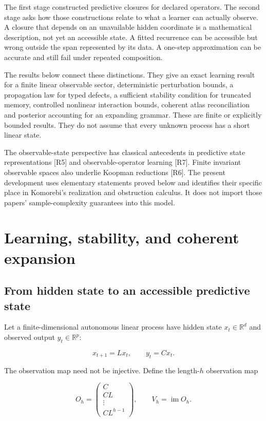 \label{LSM:part-ii.-learning-stability-and-coherent-expansion}

The first stage constructed predictive closures for declared operators.
The second stage asks how those constructions relate to what a learner
can actually observe. A closure that depends on an unavailable hidden
coordinate is a mathematical description, not yet an accessible state. A
fitted recurrence can be accessible but wrong outside the span
represented by its data. A one-step approximation can be accurate and
still fail under repeated composition.

The results below connect these distinctions. They give an exact
learning result for a finite linear observable sector, deterministic
perturbation bounds, a propagation law for typed defects, a sufficient
stability condition for truncated memory, controlled nonlinear
interaction bounds, coherent atlas reconciliation and posterior
accounting for an expanding grammar. These are finite or explicitly
bounded results. They do not assume that every unknown process has a
short linear state.

The observable-state perspective has classical antecedents in predictive
state representations {[}R5{]} and observable-operator learning
{[}R7{]}. Finite invariant observable spaces also underlie Koopman
reductions {[}R6{]}. The present development uses elementary statements
proved below and identifies their specific place in Komorebi's
realization and obstruction calculus. It does not import those papers'
sample-complexity guarantees into this model.


\chapter{Learning, stability, and coherent expansion}\label{LSM:book:chapter-32}
\section{From hidden state to an accessible predictive state}\label{LSM:from-hidden-state-to-an-accessible-predictive-state}

Let a finite-dimensional autonomous linear process have hidden state
\(x_t\in\mathbb R^d\) and observed output \(y_t\in\mathbb R^p\):

\[
x_{t+1}=Lx_t,\qquad y_t=Cx_t.
\]

The observation map need not be injective. Define the length-\(h\)
observation map

\[
O_h=\begin{pmatrix}C\\CL\\\vdots\\CL^{h-1}\end{pmatrix},
\qquad V_h=\operatorname{im}O_h.
\]

